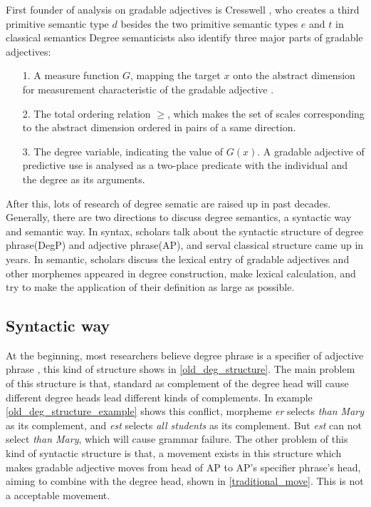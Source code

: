 \documentclass{ctexart}
\let \cite \parencite
\begin{document}
\noindent
First founder of analysis on gradable adjectives is Cresswell \cite{cresswell1976}, who creates a third primitive semantic type $d$ besides the two primitive semantic types $e$ and $t$ in classical semantics Degree semanticists also identify three major parts of gradable adjectives:

\begin{itemize}
    \item[1.] A measure function $G$, mapping the target $x$ onto the abstract dimension for measurement characteristic of the gradable adjective \cite{bartsch1974}.
    \item[2.] The total ordering relation $\geq$, which makes the set of scales corresponding to the abstract dimension ordered in pairs of a same direction.
    \item[3.] The degree variable, indicating the value of $G(x)$. A gradable adjective of predictive use is analysed as a two-place predicate with the individual and the degree as its arguments.
\end{itemize}

After this, lots of research of degree sematic are raised up in past decades. Generally, there are two directions to discuss degree semantics, a syntactic way and semantic way. In syntax, scholars talk about the syntactic structure of degree phrase(DegP) and adjective phrase(AP), and serval classical structure came up in years. In semantic, scholars discuss the lexical entry of gradable adjectives and other morphemes appeared in degree construction, make lexical calculation, and try to make the application of their definition as large as possible.

\subsection{Syntactic way}

At the beginning, most researchers believe degree phrase is a specifier of adjective phrase \cite{chomsky1977,selkirk2015,bresnan1973,heim2000}, this kind of structure shows in \ref{old_deg_structure}. The main problem of this structure is that, standard as complement of the degree head will cause different degree heads lead different kinds of complements. In example \ref{old_deg_structure_example} shows this conflict, morpheme \textit{er} selects \textit{than Mary} as its complement, and \textit{est} selects \textit{all students} as its complement. But \textit{est} can not select \textit{than Mary}, which will cause grammar failure. The other problem of this kind of syntactic structure is that, a movement exists in this structure which makes gradable adjective moves from head of AP to AP's specifier phrase's head, aiming to combine with the degree head, shown in \ref{traditional_move}. This is not a acceptable movement.  
\end{document}
